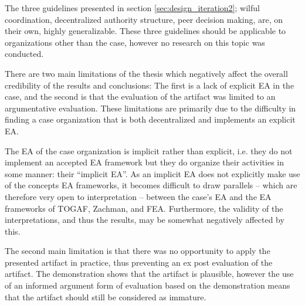 %
%
%
%
%
%
The three guidelines presented in section \ref{sec:design_iteration2}; wilful coordination, decentralized authority structure, peer decision making, are, on their own, highly generalizable. These three guidelines should be applicable to organizations other than the case, however no research on this topic was conducted.

There are two main limitations of the thesis which negatively affect the overall credibility of the results and conclusions: The first is a lack of explicit EA in the case, and the second is that the evaluation of the artifact was limited to an argumentative evaluation. These limitations are primarily due to the difficulty in finding a case organization that is both decentralized and implements an explicit EA. 

The EA of the case organization is implicit rather than explicit, i.e. they do not implement an accepted EA framework but they do organize their activities in some manner: their ``implicit EA''. As an implicit EA does not explicitly make use of the concepts EA frameworks, it becomes difficult to draw parallels -- which are therefore very open to interpretation -- between the case's EA and the EA frameworks of TOGAF, Zachman, and FEA.  Furthermore, the validity of the interpretations, and thus the results, may be somewhat negatively affected by this.

The second main limitation is that there was no opportunity to apply the presented artifact in practice, thus preventing an ex post evaluation of the artifact. The demonstration shows that the artifact is plausible, however the use of an informed argument form of evaluation based on the demonstration means that the artifact should still be considered as immature.

